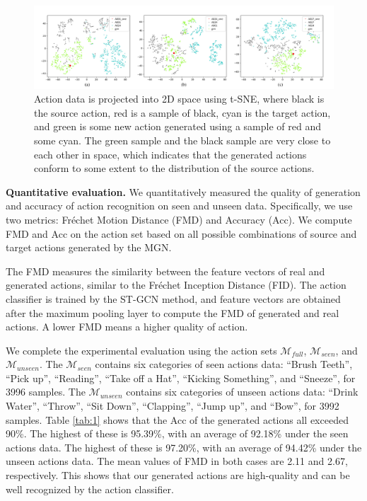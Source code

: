 \begin{figure}[htpb]
  \centering
   \includegraphics[width=0.8\linewidth]{figures/Fig3.jpg}

   \caption{Action data is projected into 2D space using t-SNE, where black is the source action, red is a sample of black, cyan is the target action, and green is some new action generated using a sample of red and some cyan. The green sample and the black sample are very close to each other in space, which indicates that the generated actions conform to some extent to the distribution of the source actions.}
   \label{fig:3}
\end{figure}

\textbf{Quantitative evaluation. }
We quantitatively measured the quality of generation and accuracy of action recognition on seen and unseen data. 
Specifically, we use two metrics: Fréchet Motion Distance (FMD) and Accuracy (Acc). 
We compute FMD and Acc on the action set based on all possible combinations of source and target actions generated by the MGN.

The FMD measures the similarity between the feature vectors of real and generated actions, similar to the Fréchet Inception Distance (FID). 
The action classifier is trained by the ST-GCN method, and feature vectors are obtained after the maximum pooling layer to compute the FMD of generated and real actions. 
A lower FMD means a higher quality of action.

We complete the experimental evaluation using the action sets $\mathcal{M}_{full}$, $\mathcal{M}_{seen}$, and $\mathcal{M}_{unseen}$. 
The $\mathcal{M}_{seen}$ contains six categories of seen actions data: “Brush Teeth”, “Pick up”, “Reading”, “Take off a Hat”, “Kicking Something”, and “Sneeze”, for 3996 samples. 
The $\mathcal{M}_{unseen}$ contains six categories of unseen actions data: “Drink Water”, “Throw”, “Sit Down”, “Clapping”, “Jump up”, and “Bow”, for 3992 samples.
Table \ref{tab:1} shows that the Acc of the generated actions all exceeded 90\%. 
The highest of these is 95.39\%, with an average of 92.18\% under the seen actions data. 
The highest of these is 97.20\%, with an average of 94.42\% under the unseen actions data. 
The mean values of FMD in both cases are 2.11 and 2.67, respectively. This shows that our generated actions are high-quality and can be well recognized by the action classifier. 

